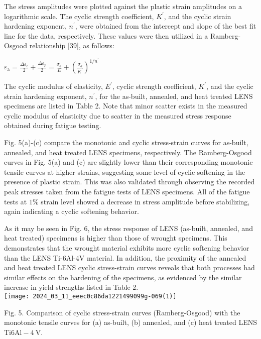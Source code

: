 \documentclass[10pt]{article}
\begin{document}
The stress amplitudes were plotted against the plastic strain amplitudes on a logarithmic scale. The cyclic strength coefficient, $K^{\prime}$, and the cyclic strain hardening exponent, $n^{\prime}$, were obtained from the intercept and slope of the best fit line for the data, respectively. These values were then utilized in a Ramberg-Osgood relationship [39], as follows:

$\varepsilon_{\mathrm{a}}=\frac{\Delta \varepsilon_{\mathrm{e}}}{2}+\frac{\Delta \varepsilon_{p}}{2}=\frac{\sigma_{a}}{E}+\left(\frac{\sigma_{a}}{K^{\prime}}\right)^{1 / n^{\prime}}$

The cyclic modulus of elasticity, $E^{\prime}$, cyclic strength coefficient, $K^{\prime}$, and the cyclic strain hardening exponent, $n^{\prime}$, for the as-built, annealed, and heat treated LENS specimens are listed in Table 2. Note that minor scatter exists in the measured cyclic modulus of elasticity due to scatter in the measured stress response obtained during fatigue testing.

Fig. 5(a)-(c) compare the monotonic and cyclic stress-strain curves for as-built, annealed, and heat treated LENS specimens, respectively. The Ramberg-Osgood curves in Fig. 5(a) and (c) are slightly lower than their corresponding monotonic tensile curves at higher strains, suggesting some level of cyclic softening in the presence of plastic strain. This was also validated through observing the recorded peak stresses taken from the fatigue tests of LENS specimens. All of the fatigue tests at $1 \%$ strain level showed a decrease in stress amplitude before stabilizing, again indicating a cyclic softening behavior.

As it may be seen in Fig. 6, the stress response of LENS (as-built, annealed, and heat treated) specimens is higher than those of wrought specimens. This demonstrates that the wrought material exhibits more cyclic softening behavior than the LENS Ti-6Al-4V material. In addition, the proximity of the annealed and heat treated LENS cyclic stress-strain curves reveals that both processes had similar effects on the hardening of the specimens, as evidenced by the similar increase in yield strengths listed in Table 2.\\
\texttt{[image: 2024\_03\_11\_eeec0c86da1221499099g-069(1)]}

Fig. 5. Comparison of cyclic stress-strain curves (Ramberg-Osgood) with the monotonic tensile curves for (a) as-built, (b) annealed, and (c) heat treated LENS Ti$6 \mathrm{Al}-4 \mathrm{~V}$.
\end{document}
